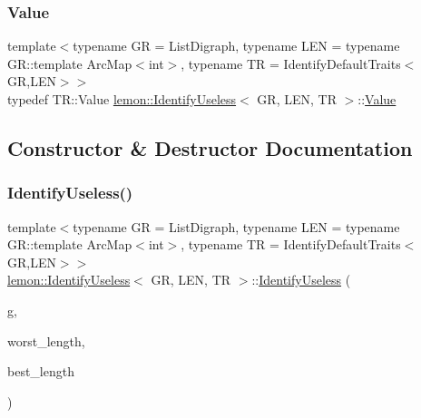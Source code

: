 \mbox{\label{classlemon_1_1_identify_useless_af6901305bc21b76ae676c554b4acb672}} 
\subsubsection{\texorpdfstring{Value}{Value}}
{\footnotesize\ttfamily template$<$typename GR  = List\+Digraph, typename L\+EN  = typename G\+R\+::template Arc\+Map$<$int$>$, typename TR  = Identify\+Default\+Traits$<$\+G\+R,\+L\+E\+N$>$$>$ \\
typedef T\+R\+::\+Value \hyperlink{classlemon_1_1_identify_useless}{lemon\+::\+Identify\+Useless}$<$ GR, L\+EN, TR $>$\+::\hyperlink{classlemon_1_1_identify_useless_af6901305bc21b76ae676c554b4acb672}{Value}}



\subsection{Constructor \& Destructor Documentation}
\mbox{\label{classlemon_1_1_identify_useless_a6bf14db861b7ed6ad63c75a0f7ff399b}} 
\subsubsection{\texorpdfstring{Identify\+Useless()}{IdentifyUseless()}}
{\footnotesize\ttfamily template$<$typename GR  = List\+Digraph, typename L\+EN  = typename G\+R\+::template Arc\+Map$<$int$>$, typename TR  = Identify\+Default\+Traits$<$\+G\+R,\+L\+E\+N$>$$>$ \\
\hyperlink{classlemon_1_1_identify_useless}{lemon\+::\+Identify\+Useless}$<$ GR, L\+EN, TR $>$\+::\hyperlink{classlemon_1_1_identify_useless}{Identify\+Useless} (\begin{DoxyParamCaption}\item[{const \hyperlink{classlemon_1_1_identify_useless_a68c5b16f64c42ef8d89c3d4c467aad06}{Digraph} \&}]{g,  }\item[{const \hyperlink{classlemon_1_1_identify_useless_a47fb50fbfa981adae466fc6e71436fee}{Length\+Map} \&}]{worst\+\_\+length,  }\item[{const \hyperlink{classlemon_1_1_identify_useless_a47fb50fbfa981adae466fc6e71436fee}{Length\+Map} \&}]{best\+\_\+length }\end{DoxyParamCaption})\hspace{0.3cm}{\ttfamily [inline]}}

